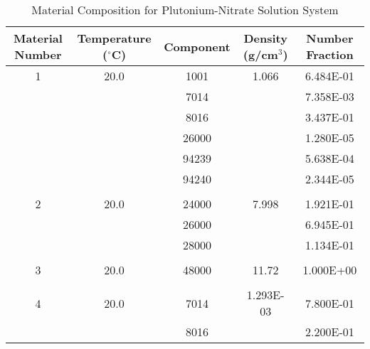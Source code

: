 \begin{table}[!htbp]
	\caption{Material Composition for Plutonium-Nitrate Solution System}
	\label{table:PU_SOL}
		\centering{}
		\begin{tabular}{@{}ccccc@{}}\toprule
			Material Number & Temperature ($^{\circ}$C) & Component & Density (g/cm$^{3}$) & Number Fraction \\ 
        			\midrule
			1 & 20.0 & 1001 & 1.066 & 6.484E-01 \\
			 & & 7014 & & 7.358E-03 \\
 			 & & 8016 & & 3.437E-01 \\
  			 & & 26000 & & 1.280E-05 \\
   			 & & 94239 & & 5.638E-04 \\
   			 & & 94240 & & 2.344E-05 \\
			 & & & & \\
			 2 & 20.0 & 24000 & 7.998 & 1.921E-01 \\
			 & & 26000 & & 6.945E-01 \\
 			 & & 28000 & & 1.134E-01 \\
			 & & & & \\
			 3 & 20.0 & 48000 & 11.72 & 1.000E+00 \\
 			 & & & & \\
			 4 & 20.0 & 7014 & 1.293E-03 & 7.800E-01 \\
 			  &  & 8016 & & 2.200E-01 \\
		\bottomrule
		\end{tabular}
\end{table}

